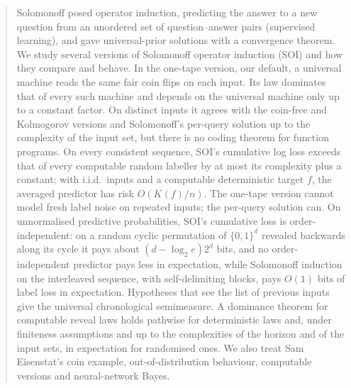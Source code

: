 \begin{abstract}
Solomonoff posed operator induction, predicting the answer to a new question from an unordered set of question--answer pairs (supervised learning), and gave universal-prior solutions with a convergence theorem. We study several versions of Solomonoff operator induction (SOI) and how they compare and behave. In the one-tape version, our default, a universal machine reads the same fair coin flips on each input. Its law dominates that of every such machine and depends on the universal machine only up to a constant factor. On distinct inputs it agrees with the coin-free and Kolmogorov versions and Solomonoff's per-query solution up to the complexity of the input set, but there is no coding theorem for function programs. On every consistent sequence, SOI's cumulative log loss exceeds that of every computable random labeller by at most its complexity plus a constant; with i.i.d.\ inputs and a computable deterministic target $f$, the averaged predictor has risk $O(K(f)/n)$. The one-tape version cannot model fresh label noise on repeated inputs; the per-query solution can. On unnormalised predictive probabilities, SOI's cumulative loss is order-independent: on a random cyclic permutation of $\{0,1\}^d$ revealed backwards along its cycle it pays about $(d-\log_2e)2^d$ bits, and no order-independent predictor pays less in expectation, while Solomonoff induction on the interleaved sequence, with self-delimiting blocks, pays $O(1)$ bits of label loss in expectation. Hypotheses that see the list of previous inputs give the universal chronological semimeasure. A dominance theorem for computable reveal laws holds pathwise for deterministic laws and, under finiteness assumptions and up to the complexities of the horizon and of the input sets, in expectation for randomised ones. We also treat Sam Eisenstat's coin example, out-of-distribution behaviour, computable versions and neural-network Bayes.
\end{abstract}

